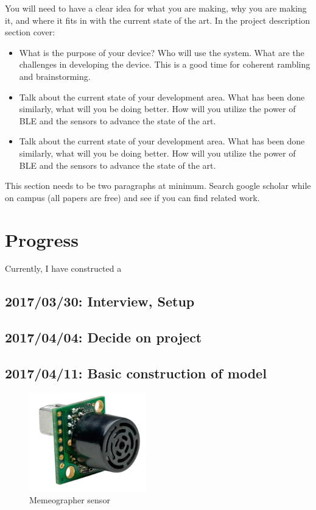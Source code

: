 \documentclass{sig-alternate-ipsn13}
\begin{document}
You will need to have a clear idea for what you are making, why you are making it, and where it fits in with the current state of the art. In the project description section cover:

\begin{itemize}
\item What is the purpose of your device? Who will use the system. What are the challenges in developing the device. This is a good time for coherent rambling and brainstorming.
\item Talk about the current state of your development area. What has been done similarly, what will you be doing better. How will you utilize the power of BLE and the sensors to advance the state of the art.
\item Talk about the current state of your development area. What has been done similarly, what will you be doing better. How will you utilize the power of BLE and the sensors to advance the state of the art.
\end{itemize}

This section needs to be two paragraphs at minimum. Search google scholar while on campus (all papers are free) and see if you can find related work.


\section{Progress} 

Currently, I have constructed a 

\subsection{2017/03/30: Interview, Setup}


\subsection{2017/04/04: Decide on project}


\subsection{2017/04/11: Basic construction of model}

\begin{figure}
  \centering 
	\includegraphics[width=2in]{images/sensor.jpg}
    \caption{Memeographer sensor}
    \label{fig:Memeographer}
\end{figure}
\end{document}
